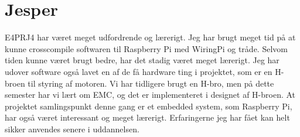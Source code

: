 \section{Jesper} 

E4PRJ4 har været meget udfordrende og lærerigt. 
Jeg har brugt meget tid på at kunne crosscompile softwaren til Raspberry Pi med WiringPi og tråde. 
Selvom tiden kunne været brugt bedre, har det stadig været meget lærerigt. 
Jeg har udover software også lavet en af de få hardware ting i projektet, som er en H-broen til styring af motoren. 
Vi har tidligere brugt en H-bro, men på dette semester har vi lært om EMC, og det er implementeret i designet af H-broen.
At projektet samlingspunkt denne gang er et embedded system, som Raspberry Pi, har også været interessant og meget lærerigt. 
Erfaringerne jeg har fået kan helt sikker anvendes senere i uddannelsen.